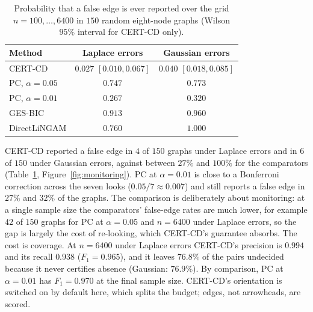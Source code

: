 \begin{table}[t]
\caption{Probability that a false edge is ever reported over the grid
$n=100,\dots,6400$ in $150$ random eight-node graphs (Wilson $95\%$ interval for
CERT-CD only).}\label{tab:monitoring}
\begin{tabular}{@{}lcc@{}}
\toprule
Method & Laplace errors & Gaussian errors\\
\midrule
CERT-CD & $0.027$ $[0.010,0.067]$ & $0.040$ $[0.018,0.085]$\\
PC, $\alpha=0.05$ & $0.747$ & $0.773$\\
PC, $\alpha=0.01$ & $0.267$ & $0.320$\\
GES-BIC & $0.913$ & $0.960$\\
DirectLiNGAM & $0.760$ & $1.000$\\
\bottomrule
\end{tabular}
\end{table}

CERT-CD reported a false edge in $4$ of $150$ graphs under Laplace errors and in
$6$ of $150$ under Gaussian errors, against between $27\%$ and $100\%$ for the
comparators (Table~\ref{tab:monitoring}, Figure~\ref{fig:monitoring}). PC at $\alpha=0.01$ is close to a Bonferroni correction across the seven looks
($0.05/7\approx0.007$) and still reports a false edge in $27\%$ and $32\%$ of the
graphs. The comparison is deliberately about
monitoring: at a single sample size the comparators' false-edge rates are much
lower, for example $42$ of $150$ graphs for PC at $\alpha=0.05$ and $n=6400$ under
Laplace errors, so the gap is largely the cost of re-looking, which CERT-CD's
guarantee absorbs. The cost is coverage. At $n=6400$ under Laplace errors
CERT-CD's precision is $0.994$ and its recall $0.938$ ($F_1=0.965$), and it
leaves $76.8\%$ of the pairs undecided because it never certifies absence
(Gaussian: $76.9\%$). By comparison, PC at $\alpha=0.01$ has $F_1=0.970$ at the
final sample size. CERT-CD's orientation is switched on by default here, which
splits the budget; edges, not arrowheads, are scored.

